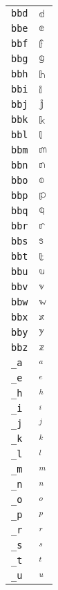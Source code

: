 \begin{longtable}{ll}
\texttt{bbd}&${}{\mathbb{d}}{}$\\
\texttt{bbe}&${}{\mathbb{e}}{}$\\
\texttt{bbf}&${}{\mathbb{f}}{}$\\
\texttt{bbg}&${}{\mathbb{g}}{}$\\
\texttt{bbh}&${}{\mathbb{h}}{}$\\
\texttt{bbi}&${}{\mathbb{i}}{}$\\
\texttt{bbj}&${}{\mathbb{j}}{}$\\
\texttt{bbk}&${}{\mathbb{k}}{}$\\
\texttt{bbl}&${}{\mathbb{l}}{}$\\
\texttt{bbm}&${}{\mathbb{m}}{}$\\
\texttt{bbn}&${}{\mathbb{n}}{}$\\
\texttt{bbo}&${}{\mathbb{o}}{}$\\
\texttt{bbp}&${}{\mathbb{p}}{}$\\
\texttt{bbq}&${}{\mathbb{q}}{}$\\
\texttt{bbr}&${}{\mathbb{r}}{}$\\
\texttt{bbs}&${}{\mathbb{s}}{}$\\
\texttt{bbt}&${}{\mathbb{t}}{}$\\
\texttt{bbu}&${}{\mathbb{u}}{}$\\
\texttt{bbv}&${}{\mathbb{v}}{}$\\
\texttt{bbw}&${}{\mathbb{w}}{}$\\
\texttt{bbx}&${}{\mathbb{x}}{}$\\
\texttt{bby}&${}{\mathbb{y}}{}$\\
\texttt{bbz}&${}{\mathbb{z}}{}$\\
\texttt{\_a}&${}_a{}$\\
\texttt{\_e}&${}_e{}$\\
\texttt{\_h}&${}_h{}$\\
\texttt{\_i}&${}_i{}$\\
\texttt{\_j}&${}_j{}$\\
\texttt{\_k}&${}_k{}$\\
\texttt{\_l}&${}_l{}$\\
\texttt{\_m}&${}_m{}$\\
\texttt{\_n}&${}_n{}$\\
\texttt{\_o}&${}_o{}$\\
\texttt{\_p}&${}_p{}$\\
\texttt{\_r}&${}_r{}$\\
\texttt{\_s}&${}_s{}$\\
\texttt{\_t}&${}_t{}$\\
\texttt{\_u}&${}_u{}$\\

\end{longtable}
